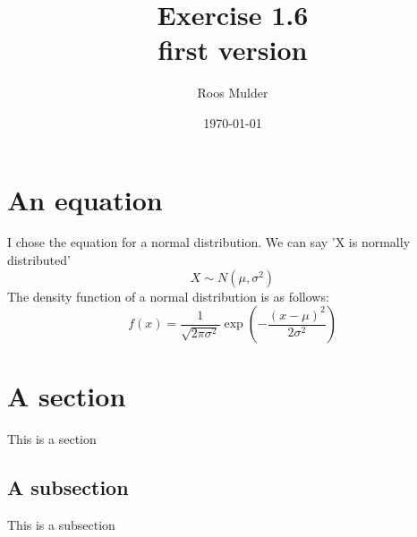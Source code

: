 \documentclass[10pt, a4paper, titlepage]{article}
\title{Exercise 1.6\\ \small first version}
\author{Roos Mulder}
\date{\today}
\begin{document}
\maketitle
\newpage

\section*{An equation}
I chose the equation for a normal distribution. We can say 'X is normally distributed' 
\[
X \sim N(\mu, \sigma^2)
\]
The density function of a normal distribution is as follows:
\[
f(x) = \frac{1}{\sqrt{2\pi\sigma^2}}
       \exp\left(-\frac{(x-\mu)^2}{2\sigma^2}\right)
\]


\section*{A section}
This is a section

\subsection*{A subsection}
This is a subsection
\end{document}
